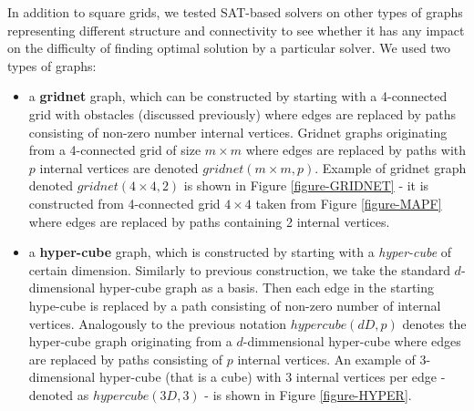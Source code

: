 \documentclass[jair,oneside,11pt]{article}
\begin{document}
In addition to square grids, we tested SAT-based solvers on other types of graphs representing different structure and connectivity to see whether it has any impact on
the difficulty of finding optimal solution by a particular solver. We used two types of graphs:

\begin{itemize}
\item a {\bf gridnet} graph, which can be constructed by starting with a 4-connected grid with obstacles (discussed previously) where edges are replaced by paths consisting of non-zero number internal vertices. Gridnet graphs originating from a 4-connected grid of size $m \times m$ where edges are replaced by paths with $p$ internal vertices are denoted $\mathit{gridnet}(m \times m, p)$. Example of gridnet graph denoted $\mathit{gridnet}(4 \times 4, 2)$ is shown in Figure \ref{figure-GRIDNET} - it is constructed from 4-connected grid $4 \times 4$ taken from Figure \ref{figure-MAPF} where edges are replaced by paths containing 2 internal vertices.

\item a {\bf hyper-cube} graph, which is constructed by starting with a {\em hyper-cube} of certain dimension. Similarly to previous construction, we take the standard $d$-dimensional hyper-cube graph as a basis. Then each edge in the starting hype-cube is replaced by a path consisting of non-zero number of internal vertices. Analogously to the previous notation $\mathit{hypercube}(dD, p)$ denotes the hyper-cube graph originating from a $d$-dimmensional hyper-cube where edges are replaced by paths consisting of $p$ internal vertices. An example of 3-dimensional hyper-cube (that is a cube) with 3 internal vertices per edge - denoted as $\mathit{hypercube}(3D, 3)$ - is shown in Figure \ref{figure-HYPER}.
\end{itemize}
\end{document}
